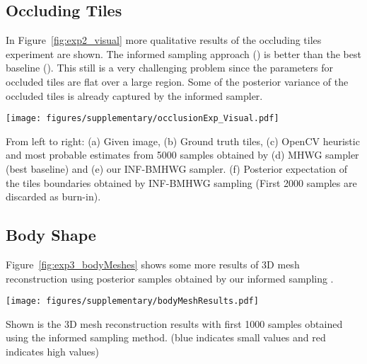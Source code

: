 \subsection{Occluding Tiles}
In Figure~\ref{fig:exp2_visual} more qualitative results of the
occluding tiles experiment are shown. The informed sampling approach
(\INFBMHWG) is better than the best baseline (\MHWG). This still is a
very challenging problem since the parameters for occluded tiles are
flat over a large region. Some of the posterior variance of the
occluded tiles is already captured by the informed sampler.

\begin{figure*}[h!]
\begin{center}
\centerline{\texttt{[image: figures/supplementary/occlusionExp\_Visual.pdf]}}
  {From left to right: (a)
  Given image, (b) Ground truth tiles, (c) OpenCV heuristic and most probable estimates
  from 5000 samples obtained by (d) MHWG sampler (best baseline) and
  (e) our INF-BMHWG sampler. (f) Posterior expectation of the tiles
  boundaries obtained by INF-BMHWG sampling (First 2000 samples are
  discarded as burn-in).}
\label{fig:exp2_visual_more}
\end{center}
\end{figure*}



\subsection{Body Shape}
Figure~\ref{fig:exp3_bodyMeshes} shows some more results of 3D mesh
reconstruction using posterior samples obtained by our informed
sampling \MIXLMH.

\begin{figure*}[t]
\begin{center}
\centerline{\texttt{[image: figures/supplementary/bodyMeshResults.pdf]}}
  {Shown is the 3D mesh reconstruction results with first 1000 samples obtained
  using the \MIXLMH informed sampling method. (blue indicates small
  values and red indicates high values)}
\label{fig:exp3_bodyMeshes}
\end{center}
\end{figure*}
